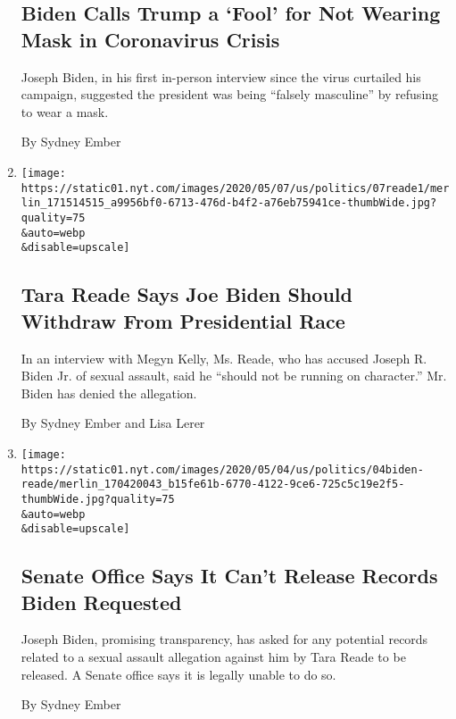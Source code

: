 \begin{enumerate}
  \hypertarget{biden-calls-trump-a-fool-for-not-wearing-mask-in-coronavirus-crisis}{%
  \subsection{Biden Calls Trump a `Fool' for Not Wearing Mask in
  Coronavirus
  Crisis}\label{biden-calls-trump-a-fool-for-not-wearing-mask-in-coronavirus-crisis}}

  Joseph Biden, in his first in-person interview since the virus
  curtailed his campaign, suggested the president was being ``falsely
  masculine'' by refusing to wear a mask.

  By Sydney Ember
\item
  \href{/2020/05/07/us/politics/tara-reade-megyn-kelly-interview.html}{}

  \texttt{[image: https://static01.nyt.com/images/2020/05/07/us/politics/07reade1/merlin\_171514515\_a9956bf0-6713-476d-b4f2-a76eb75941ce-thumbWide.jpg?quality=75\\\&auto=webp\\\&disable=upscale]}

  \hypertarget{tara-reade-says-joe-biden-should-withdraw-from-presidential-race}{%
  \subsection{Tara Reade Says Joe Biden Should Withdraw From
  Presidential
  Race}\label{tara-reade-says-joe-biden-should-withdraw-from-presidential-race}}

  In an interview with Megyn Kelly, Ms. Reade, who has accused Joseph R.
  Biden Jr. of sexual assault, said he ``should not be running on
  character.'' Mr. Biden has denied the allegation.

  By Sydney Ember and Lisa Lerer
\item
  \href{/2020/05/04/us/politics/joe-biden-tara-reade-sexual-assault.html}{}

  \texttt{[image: https://static01.nyt.com/images/2020/05/04/us/politics/04biden-reade/merlin\_170420043\_b15fe61b-6770-4122-9ce6-725c5c19e2f5-thumbWide.jpg?quality=75\\\&auto=webp\\\&disable=upscale]}

  \hypertarget{senate-office-says-it-cant-release-records-biden-requested}{%
  \subsection{Senate Office Says It Can't Release Records Biden
  Requested}\label{senate-office-says-it-cant-release-records-biden-requested}}

  Joseph Biden, promising transparency, has asked for any potential
  records related to a sexual assault allegation against him by Tara
  Reade to be released. A Senate office says it is legally unable to do
  so.

  By Sydney Ember
\end{enumerate}

